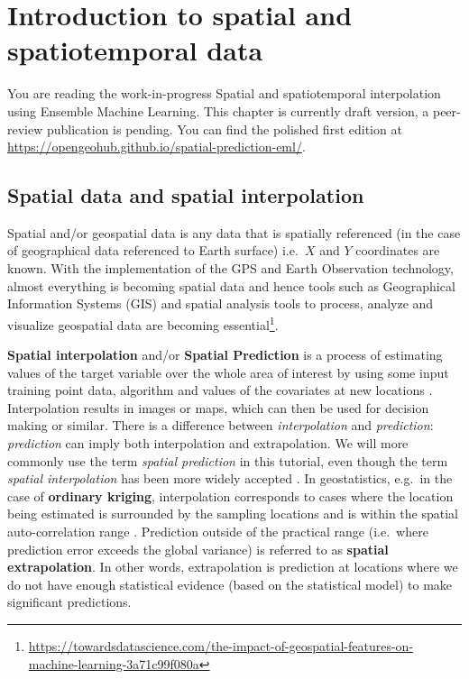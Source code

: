 \documentclass[
  graybox,natbib,nospthms]{svmono}
\renewcommand{\href}[2]{#2 (\url{#1})}
\renewcommand{\href}[2]{#2\footnote{\url{#1}}}
\begin{document}
\hypertarget{introduction-to-spatial-and-spatiotemporal-data}{%
\chapter{Introduction to spatial and spatiotemporal data}\label{introduction-to-spatial-and-spatiotemporal-data}}

You are reading the work-in-progress Spatial and spatiotemporal interpolation using Ensemble Machine Learning. This chapter is currently draft version, a peer-review publication is pending. You can find the polished first edition at \url{https://opengeohub.github.io/spatial-prediction-eml/}.

\hypertarget{spatial-data-and-spatial-interpolation}{%
\section{Spatial data and spatial interpolation}\label{spatial-data-and-spatial-interpolation}}

Spatial and/or geospatial data is any data that is spatially referenced (in the
case of geographical data referenced to Earth surface) i.e.~\(X\) and \(Y\) coordinates
are known. With the implementation of the GPS and Earth Observation technology,
almost everything is becoming spatial data and hence tools such as Geographical
Information Systems (GIS) and spatial analysis tools to process, analyze and
visualize geospatial data are \href{https://towardsdatascience.com/the-impact-of-geospatial-features-on-machine-learning-3a71c99f080a}{becoming essential}.

\textbf{Spatial interpolation} and/or \textbf{Spatial Prediction} is a process of estimating values
of the target variable over the whole area of interest by using some input training
point data, algorithm and values of the covariates at new locations \citep{Mitas1999Wiley}.
Interpolation results in images or maps, which can then be used for decision making or similar.
There is a difference between \emph{interpolation} and \emph{prediction}: \emph{prediction}
can imply both interpolation and extrapolation. We will more commonly use the
term \emph{spatial prediction} in this tutorial, even though the term \emph{spatial interpolation}
has been more widely accepted \citep{Mitas1999Wiley}. In geostatistics, e.g.~in the
case of \textbf{ordinary kriging}, interpolation corresponds to cases where the
location being estimated is surrounded by the sampling locations and is within
the spatial auto-correlation range \citep{Diggle2007Springer}. Prediction outside of the practical range
(i.e.~where prediction error exceeds the global variance) is referred to as
\textbf{spatial extrapolation}. In other words, extrapolation is prediction at locations
where we do not have enough statistical evidence (based on the statistical model)
to make significant predictions.
\end{document}
